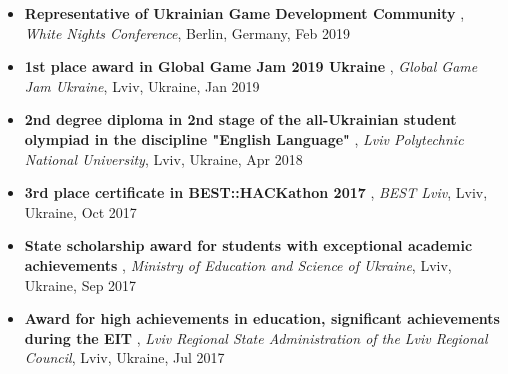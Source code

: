 \documentclass[letterpaper,10pt]{article}
\newcommand{\titleItem}[1]{
  \textbf{#1}
}
\begin{document}
\begin{itemize}[leftmargin=0.15in, label={}]
    \item
			\titleItem{Representative of Ukrainian Game Development Community}, \emph{White Nights Conference}, {Berlin, Germany}, Feb 2019
			\vspace{-9pt}
		
    \item
			\titleItem{1st place award in Global Game Jam 2019 Ukraine}, \emph{Global Game Jam Ukraine}, {Lviv, Ukraine}, Jan 2019
			\vspace{-9pt}
		
    \item
			\titleItem{2nd degree diploma in 2nd stage of the all-Ukrainian student olympiad in the discipline "English Language"}, \emph{Lviv Polytechnic National University}, {Lviv, Ukraine}, Apr 2018
			\vspace{-9pt}
		
    \item
			\titleItem{3rd place certificate in BEST::HACKathon 2017}, \emph{BEST Lviv}, {Lviv, Ukraine}, Oct 2017
			\vspace{-9pt}
		
    \item
			\titleItem{State scholarship award for students with exceptional academic achievements}, \emph{Ministry of Education and Science of Ukraine}, {Lviv, Ukraine}, Sep 2017
			\vspace{-9pt}
		
    \item
			\titleItem{Award for high achievements in education, significant achievements during the EIT}, \emph{Lviv Regional State Administration of the Lviv Regional Council}, {Lviv, Ukraine}, Jul 2017
			\vspace{-9pt}
		
    \end{itemize}
	

\end{document}
